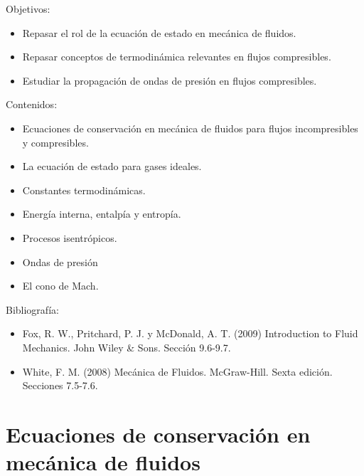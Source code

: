 \begin{framed}

Objetivos:
\begin{itemize}
    \item Repasar el rol de la ecuación de estado en mecánica de fluidos.
    \item Repasar conceptos de termodinámica relevantes en flujos compresibles.
    \item Estudiar la propagación de ondas de presión en flujos compresibles.
\end{itemize}

Contenidos:
\begin{itemize}
    \item Ecuaciones de conservación en mecánica de fluidos para flujos incompresibles y compresibles. 
    \item La ecuación de estado para gases ideales. 
    \item Constantes termodinámicas.
    \item Energía interna, entalpía y entropía.
    \item Procesos isentrópicos.
    \item Ondas de presión
    \item El cono de Mach. 
\end{itemize}

Bibliografía:
\begin{itemize}
    \item Fox, R. W., Pritchard, P. J. y McDonald, A. T. (2009) Introduction to Fluid Mechanics. John Wiley \& Sons. Sección 9.6-9.7.
    \item White, F. M. (2008) Mecánica de Fluidos. McGraw-Hill. Sexta edición. Secciones 7.5-7.6.
\end{itemize}
\end{framed}

\section*{Ecuaciones de conservación en mecánica de fluidos}

